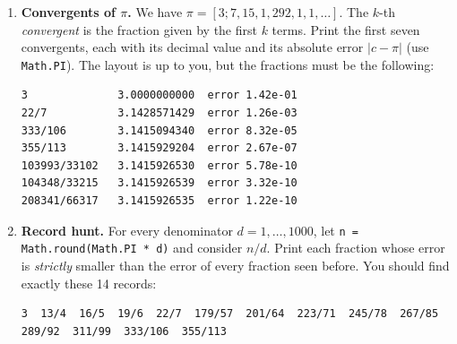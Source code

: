 \documentclass[11pt,a4paper]{article}
\newcommand{\code}[1]{\lstinline[basicstyle=\ttfamily\normalsize,basewidth=0.5em]{#1}}
\begin{document}
\begin{enumerate}[label=(\alph*), resume]
  \item \textbf{Convergents of $\pi$.} We have
        $\pi = [3; 7, 15, 1, 292, 1, 1, \dots]$. The $k$-th \emph{convergent}
        is the fraction given by the first $k$ terms. Print the first seven
        convergents, each with its decimal value and its absolute error
        $|c - \pi|$ (use \code{Math.PI}). The layout is up to you, but the fractions
        must be the following:
\begin{lstlisting}[style=out]
3              3.0000000000  error 1.42e-01
22/7           3.1428571429  error 1.26e-03
333/106        3.1415094340  error 8.32e-05
355/113        3.1415929204  error 2.67e-07
103993/33102   3.1415926530  error 5.78e-10
104348/33215   3.1415926539  error 3.32e-10
208341/66317   3.1415926535  error 1.22e-10
\end{lstlisting}
  \item \textbf{Record hunt.} For every denominator $d = 1, \dots, 1000$, let
        \code{n = Math.round(Math.PI * d)} and consider $n/d$. Print each
        fraction whose error is \emph{strictly} smaller than the error of every
        fraction seen before. You should find exactly these 14 records:
\begin{lstlisting}[style=out]
3  13/4  16/5  19/6  22/7  179/57  201/64  223/71  245/78  267/85
289/92  311/99  333/106  355/113
\end{lstlisting}
\end{enumerate}
\end{document}
